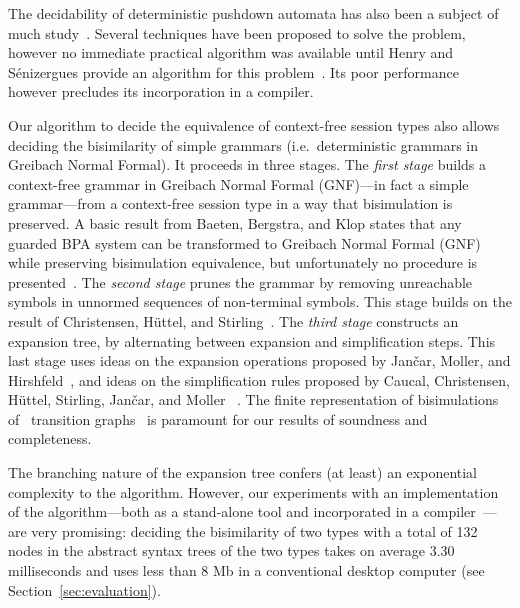 
The decidability of deterministic pushdown automata has also been a
subject of much
study~\cite{janvcar2008selected,senizergues1997equivalence,stirling2001decidability}.
Several techniques have been proposed to solve the problem, however no
immediate practical algorithm was available until Henry and
Sénizergues provide an algorithm for this
problem~\cite{henry2013lalblc}. Its poor performance however precludes
its incorporation in a compiler.

Our algorithm to decide the equivalence of context-free session types
also allows deciding the bisimilarity of simple grammars (i.e.\
deterministic grammars in Greibach Normal Formal).  It proceeds in
three stages.
%
The \emph{first stage} builds a context-free grammar in Greibach
Normal Formal (GNF)---in fact a simple grammar---from a context-free
session type in a way that bisimulation is preserved.  A basic result
from Baeten, Bergstra, and Klop states that any guarded BPA system can
be transformed to Greibach Normal Formal (GNF) while preserving
bisimulation equivalence, but unfortunately no procedure is
presented~\cite{baeten1993decidability}.
%
The \emph{second stage} prunes the grammar by removing unreachable
symbols in unnormed sequences of non-terminal symbols. This stage
builds on the result of Christensen, H\"uttel, and 
Stirling~\cite{DBLP:journals/iandc/ChristensenHS95}.
%
The \emph{third stage} constructs an expansion tree, by alternating
between expansion and simplification steps.  This last stage uses
ideas on the expansion operations proposed by Jan\v car, Moller, and
Hirshfeld~\cite{hirshfeld1996bisimulation,janvcar1999techniques}, and
ideas on the simplification rules proposed by Caucal, Christensen,
H\"uttel, Stirling, Jan\v car, and Moller
~\cite{caucal1986decidabilite,DBLP:journals/iandc/ChristensenHS95,janvcar1999techniques}.
The finite representation of bisimulations of \BPA\ transition
graphs~\cite{caucal1986decidabilite,DBLP:journals/iandc/ChristensenHS95}
is paramount for our results of soundness and completeness.


The branching nature of the expansion tree confers (at least) an
exponential complexity to the algorithm.
%
However, our experiments with an implementation of the
algorithm---both as a stand-alone tool and incorporated in a
compiler~\cite{almeida.etal_freest-functional-language}---are very
promising: deciding the bisimilarity of two types with a total of 132
nodes in the abstract syntax trees of the two types takes on average
3.30 milliseconds and uses less than 8 Mb in a conventional desktop
computer (see Section~\ref{sec:evaluation}).

